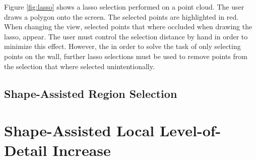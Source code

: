 Figure \ref{fig:lasso} shows a lasso selection performed on a point cloud. The user draws a polygon onto the screen. The selected points are highlighted in red. When changing the view, selected points that where occluded when drawing the lasso, appear. The user must control the selection distance by hand in order to minimize this effect. However, the in order to solve the task of only selecting points on the wall, further lasso selections must be used to remove points from the selection that where selected unintentionally. 





\subsection{Shape-Assisted Region Selection}
\section{Shape-Assisted Local Level-of-Detail Increase}
